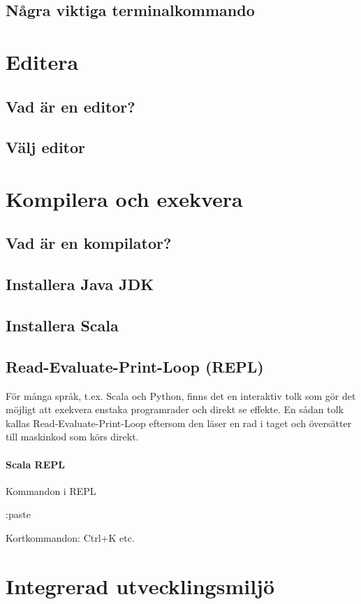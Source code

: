 \documentclass[a4paper]{compendium}
\begin{document}
\section{Några viktiga terminalkommando}

\chapter{Editera}
\section{Vad är en editor?}
\section{Välj editor}

\chapter{Kompilera och exekvera}
\section{Vad är en kompilator?}
\section{Installera Java JDK}
\section{Installera Scala}
\section{Read-Evaluate-Print-Loop (REPL)}
För många språk, t.ex. Scala och Python, finns det en interaktiv tolk som gör det möjligt att exekvera enstaka programrader och direkt se effekte. En sådan tolk kallas Read-Evaluate-Print-Loop eftersom den läser en rad i taget och översätter till maskinkod som körs direkt.    

\subsubsection{Scala REPL}

Kommandon i REPL

:paste

Kortkommandon: Ctrl+K etc.

\chapter{Integrerad utvecklingsmiljö}
\end{document}
